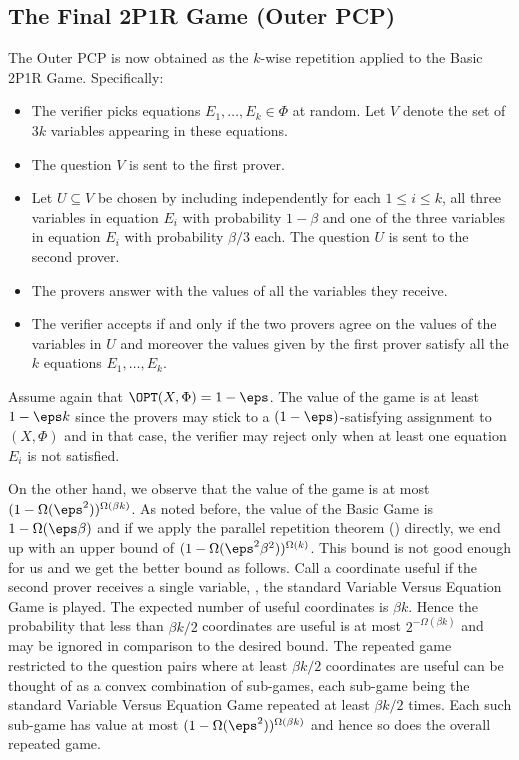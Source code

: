 \subsection{The Final 2P1R Game (Outer PCP)}

The Outer PCP is now obtained as the $k$-wise repetition applied to the Basic 2P1R Game. Specifically:

\begin{itemize}
\item The verifier picks equations $E_1,\ldots,E_k \in \Phi$ at random. Let $V$ denote the set of $3k$ variables appearing in these equations.
\item The question $V$ is sent to the first prover.
\item Let $U \subseteq V$ be chosen by including independently for each $1 \leq i \leq k$, all three variables in equation $E_i$ with probability $1-\beta$ and one of the three variables in equation
    $E_i$ with probability ${\beta}/{3}$ each. The question $U$ is sent to the second prover.
\item The provers answer with the values of all the variables they receive.
\item The verifier accepts if and only if the two provers agree on the
      values of the variables in $U$ and moreover the values given by the first prover
      satisfy all the $k$ equations $E_1, \ldots, E_k$.
\end{itemize}

Assume again that $\OPT(X,\Phi) = 1-\eps$.  The value of the game is at least $1-\eps k $
since the provers
may stick to a $(1-\eps)$-satisfying assignment to $(X,\Phi)$ and in that case, the verifier may reject only
when at least one equation $E_i$ is not satisfied.

On the other hand, we observe that the value of the game is at most $(1-\Omega(\eps^2))^{\Omega(\beta k)}$.
As noted before, the value of the Basic Game is $1-\Omega(\eps \beta)$ and if we apply the parallel repetition
theorem () directly, we end up with an upper bound of
$(1-\Omega(\eps^2 \beta^2))^{\Omega(k)}$. This bound is not good enough for us and
we get the better bound as follows.
Call a coordinate useful if the second prover receives a single variable, \ie,
the standard Variable Versus Equation Game is played. The expected number of useful
coordinates is $\beta k$. Hence the probability that less than $\beta k/2$
coordinates are useful is at most $2^{-\Omega(\beta k)}$ and may be ignored in comparison to the desired bound.
The repeated game restricted to the question pairs where at least $\beta k/2$
coordinates are useful can be thought of as a convex combination of sub-games,
each sub-game being the standard Variable Versus Equation Game repeated at least
$\beta k/2$ times. Each such sub-game has value at most $(1-\Omega(\eps^2))^{\Omega(\beta k)}$
and hence
so does the overall repeated game.

